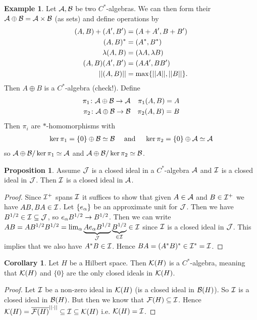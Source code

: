 \documentclass[10pt,english,a4paper]{article}
\theoremstyle{definition}
\newtheorem*{corollary}{Corollary}
\newtheorem*{proposition}{Proposition}
\newtheorem*{example}{Example}
\let\emph\relax %
\begin{document}
\begin{example}
Let $\mathcal{A}, \mathcal{B}$ be two $C^*$-algebras. We can then form their
\emph{direct sum} $\mathcal{A} \oplus \mathcal{B} = \mathcal{A} \times \mathcal{B}$ (as sets) and 
define operations by 
\begin{align*}
    (A,B)+(A',B') &= (A+A',B+B') \\
    (A,B)^* &= (A^*, B^*) \\
    \lambda (A,B) &= (\lambda A, \lambda B) \\
    (A,B)(A',B') &= (AA', BB') \\
    ||(A,B)|| &= \max\{||A||, ||B||\}.
\end{align*}    
Then $A\oplus B$ is a $C^*$-algebra (check!).
Define
\begin{align*}
    \pi_1 \colon \mathcal{A}\oplus \mathcal{B} \to \mathcal{A} && \pi_{1} (A,B) = A \\
    \pi_2 \colon \mathcal{A}\oplus \mathcal{B} \to \mathcal{B} && \pi_{2} (A,B) = B \\
\end{align*}
Then $\pi_i$ are $*$-homomorphisms with 
\begin{align*}
    \ker \pi_1 = \{0\} \oplus \mathcal{B} \simeq \mathcal{B} \quad\text{ and } \quad   
    \ker \pi_2 = \{0\} \oplus \mathcal{A} \simeq \mathcal{A}    
\end{align*}
so $\mathcal{A} \oplus\mathcal{B} /\ker \pi_1 \simeq \mathcal{A}$ and $\mathcal{A} \oplus\mathcal{B} /\ker \pi_2 \simeq
\mathcal{B}$.

\end{example}

\begin{proposition}
    Assume $\mathcal{J}$ is a closed ideal in a $C^*$-algebra $\mathcal{A}$ and 
$\mathcal{I}$ is a closed ideal in $\mathcal{J}$. Then $\mathcal{I}$ is a closed ideal in $\mathcal{A}$.
\end{proposition}
\begin{proof}
    Since $\mathcal{I}^+$ spans $\mathcal{I}$ it suffices to show that given $A\in \mathcal{A}$ and 
$B \in \mathcal{I}^+$ we have $AB, BA \in \mathcal{I}$. Let 
$\{e_{\alpha}\}$ be an approximate unit for $\mathcal{J}$. Then we have 
$B^{1/2} \in \mathcal{I} \subseteq \mathcal{J}$, so $e_{\alpha}B^{1/2} \to B^{1/2}$.
Then we can write $AB = AB^{1/2}B^{1/2} = 
\lim_{\alpha} \underbrace{Ae_{\alpha}B^{1/2}}_{
\mathcal{J}} \underbrace{B^{1/2}}_{\in \mathcal{I}} \in \mathcal{I} $ since $\mathcal{I}$ is a closed ideal in $\mathcal{J}$.
This implies that we also have $A^*B \in \mathcal{I}$. Hence $BA = (A^*B)^* \in \mathcal{I}^* = \mathcal{I}$.


\end{proof}

\begin{corollary}
    Let $H$ be a Hilbert space. Then $\mathcal{K}(H)$ is a \emph{simple} $C^*$-algebra, meaning 
that $\mathcal{K}(H)$ and $\{0\}$ are the only closed ideals in $\mathcal{K}(H)$.
\end{corollary}
\begin{proof}
    Let $\mathcal{I}$ be a non-zero ideal in $\mathcal{K}(H)$ (is a closed ideal in $\mathcal{B}(H)$). 
    So $\mathcal{I}$ is a closed ideal in $\mathcal{B}(H)$. But then we know that 
    $\mathcal{F}(H) \subseteq \mathcal{I}$. Hence $\mathcal{K}(H)  = \overline{\mathcal{F}(H)}^{||\cdot||} \subseteq
    \mathcal{I} \subseteq \mathcal{K}(H)$ i.e. $\mathcal{K}(H) = \mathcal{I}$.
\end{proof}
\end{document}
